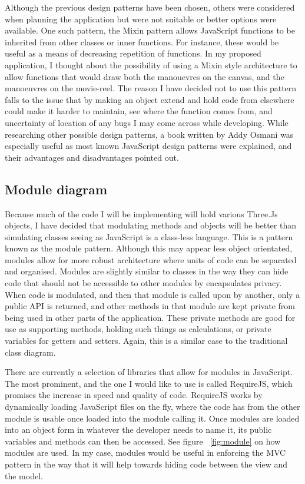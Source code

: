 Although the previous design patterns have been chosen, others were considered when planning the application but were not suitable or better options were available. One such pattern, the Mixin pattern allows JavaScript functions to be inherited from other classes or inner functions. For instance, these would be useful as a means of decreasing repetition of functions. In my proposed application, I thought about the possibility of using a Mixin style architecture to allow functions that would draw both the manouevres on the canvas, and the manoeuvres on the movie-reel. The reason I have decided not to use this pattern falls to the issue that by making an object extend and hold code from elsewhere could make it harder to maintain, see where the function comes from, and uncertainty of location of any bugs I may come across while developing. While researching other possible design patterns, a book written by Addy Osmani \cite{design_patterns} was especially useful as most known JavaScript design patterns were explained, and their advantages and disadvantages pointed out.

\subsection{Module diagram}
\label{sec:module}
Because much of the code I will be implementing will hold various Three.Js objects, I have decided that modulating methods and objects will be better than simulating classes seeing as JavaScript is a class-less language. This is a pattern known as the module pattern. Although this may appear less object orientated, modules allow for more robust architecture where units of code can be separated and organised. Modules are slightly similar to classes in the way they can hide code that should not be accessible to other modules by encapsulates privacy. When code is modulated, and then that module is called upon by another, only a public API is returned, and other methods in that module are kept private from being used in other parts of the application. These private methods are good for use as supporting methods, holding such things as calculations, or private variables for getters and setters. Again, this is a similar case to the traditional class diagram.

There are currently a selection of libraries that allow for modules in JavaScript. The most prominent, and the one I would like to use is called RequireJS, which promises the increase in speed and quality of code. RequireJS works by dynamically loading JavaScript files on the fly, where the code has from the other module is usable once loaded into the module calling it. Once modules are loaded into an object form in whatever the developer needs to name it, its public variables and methods can then be accessed. See figure ~\ref{fig:module} on how modules are used. In my case, modules would be useful in enforcing the MVC pattern in the way that it will help towards hiding code between the view and the model. 

